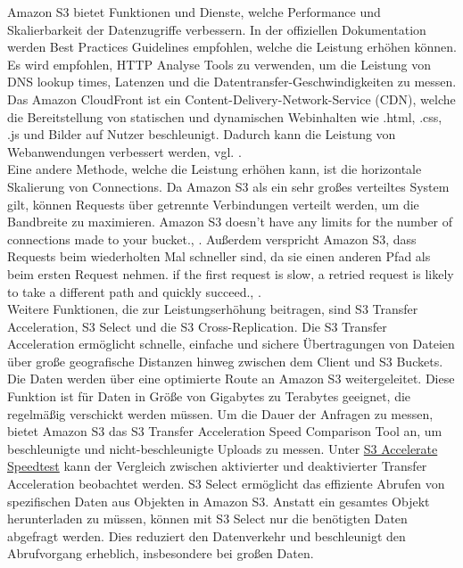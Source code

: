 Amazon S3 bietet Funktionen und Dienste, welche Performance und Skalierbarkeit der Datenzugriffe verbessern. In der offiziellen Dokumentation \cite{perf-guide} werden Best Practices Guidelines empfohlen, welche die Leistung erhöhen können. Es wird empfohlen, HTTP Analyse Tools zu verwenden, um die Leistung von DNS lookup times, Latenzen und die Datentransfer-Geschwindigkeiten zu messen.\\

Das Amazon CloudFront ist ein Content-Delivery-Network-Service (CDN), welche die Bereitstellung von statischen und dynamischen Webinhalten wie .html, .css, .js und Bilder auf Nutzer beschleunigt. Dadurch kann die Leistung von Webanwendungen verbessert werden, vgl. \cite{aws-cdn}.\\

Eine andere Methode, welche die Leistung erhöhen kann, ist die horizontale Skalierung von Connections. Da Amazon S3 als ein sehr großes verteiltes System gilt, können Requests über getrennte Verbindungen verteilt werden, um die Bandbreite zu maximieren. \glqq Amazon S3 doesn't have any limits for the number of connections made to your bucket.\grqq, \cite{perf-guide}. Außerdem verspricht Amazon S3, dass Requests beim wiederholten Mal schneller sind, da sie einen anderen Pfad als beim ersten Request nehmen. \glqq[...] if the first request is slow, a retried request is likely to take a different path and quickly succeed.\grqq, \cite{perf-guide}.\\

Weitere Funktionen, die zur Leistungserhöhung beitragen, sind S3 Transfer Acceleration, S3 Select und die S3 Cross-Replication. Die S3 Transfer Acceleration ermöglicht schnelle, einfache und sichere Übertragungen von Dateien über große geografische Distanzen hinweg zwischen dem Client und S3 Buckets. Die Daten werden über eine optimierte Route an Amazon S3 weitergeleitet. Diese Funktion ist für Daten in Größe von Gigabytes zu Terabytes geeignet, die regelmäßig verschickt werden müssen. Um die Dauer der Anfragen zu messen, bietet Amazon S3 das S3 Transfer Acceleration Speed Comparison Tool an, um beschleunigte und nicht-beschleunigte Uploads zu messen. Unter \href{https://s3-accelerate-speedtest.s3-accelerate.amazonaws.com/en/accelerate-speed-comparsion.html}{S3 Accelerate Speedtest} kann der Vergleich zwischen aktivierter und deaktivierter Transfer Acceleration beobachtet werden. S3 Select ermöglicht das effiziente Abrufen von spezifischen Daten aus Objekten in Amazon S3. Anstatt ein gesamtes Objekt herunterladen zu müssen, können mit S3 Select nur die benötigten Daten abgefragt werden. Dies reduziert den Datenverkehr und beschleunigt den Abrufvorgang erheblich, insbesondere bei großen Daten.\\

